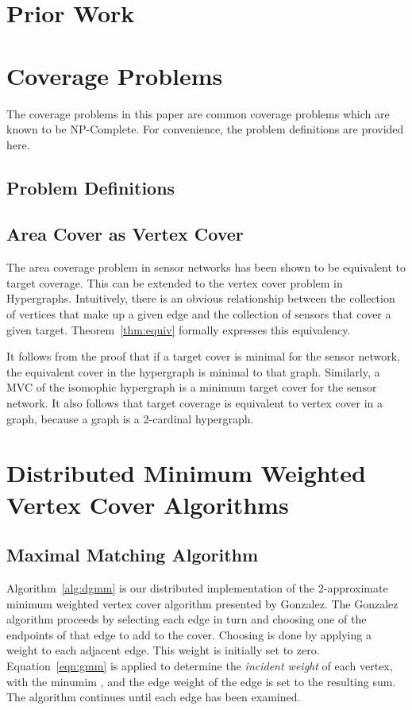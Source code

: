 \section{Prior Work}

\section{Coverage Problems}
The coverage problems in this paper are common coverage problems which are known to be NP-Complete. For convenience, the problem definitions are provided here.
\subsection{Problem Definitions}



\subsection{Area Cover as Vertex Cover}
\label{sec:area-vertex}
The area coverage problem in sensor networks has been shown to be equivalent to target coverage.\cite{IPDPS.2008.45361} This can be extended to the vertex cover problem in Hypergraphs. Intuitively, there is an obvious relationship between the collection of vertices that make up a given edge and the collection of sensors that cover a given target.  Theorem~\ref{thm:equiv} formally expresses this equivalency.



It follows from the proof that if a target cover is minimal for the sensor network, the equivalent cover in the hypergraph is minimal to that graph. Similarly, a MVC of the isomophic hypergraph is a minimum target cover for the sensor network. It also follows that target coverage is equivalent to vertex cover in a graph, because a graph is a 2-cardinal hypergraph.

\section{Distributed Minimum Weighted Vertex Cover Algorithms}
\label{sec:algorithms}

\subsection{Maximal Matching Algorithm}
Algorithm~\ref{alg:dgmm} is our distributed implementation of the 2-approximate minimum weighted vertex cover algorithm presented by Gonzalez.\cite{Gonzalez1995129} The Gonzalez algorithm proceeds by selecting each edge in turn and choosing one of the endpoints of that edge to add to the cover. Choosing is done by applying a weight to each adjacent edge. This weight is initially set to zero. Equation~\ref{eqn:gmm} is applied to determine the {\em incident weight} of each vertex, with the minumim , and the edge weight of the edge is set to the resulting sum. The algorithm continues until each edge has been examined.

